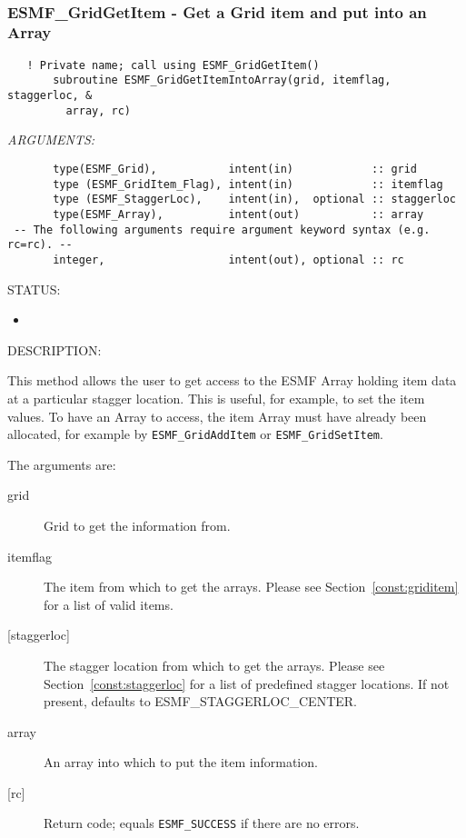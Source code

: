  
\mbox{}\hrulefill\ 
 

  \label{API:GridGetItemIntoArray}\subsubsection [ESMF\_GridGetItem] {ESMF\_GridGetItem - Get a Grid item and put into an Array}


 
\begin{verbatim}   ! Private name; call using ESMF_GridGetItem()
       subroutine ESMF_GridGetItemIntoArray(grid, itemflag,  staggerloc, &
         array, rc)\end{verbatim}{\em ARGUMENTS:}
\begin{verbatim}       type(ESMF_Grid),           intent(in)            :: grid
       type (ESMF_GridItem_Flag), intent(in)            :: itemflag
       type (ESMF_StaggerLoc),    intent(in),  optional :: staggerloc
       type(ESMF_Array),          intent(out)           :: array
 -- The following arguments require argument keyword syntax (e.g. rc=rc). --
       integer,                   intent(out), optional :: rc\end{verbatim}
{\sf STATUS:}
   \begin{itemize}
   \item{}
   \end{itemize}
  
{\sf DESCRIPTION:\\ }


      This method allows the user to get access to the ESMF Array holding
      item data at a particular stagger location. This is useful, for example,
      to set the item values. To have an Array to access, the item Array
      must have already been allocated, for example by {\tt ESMF\_GridAddItem} or
      {\tt ESMF\_GridSetItem}.
  
       The arguments are:
       \begin{description}
       \item[grid]
            Grid to get the information from.
       \item[itemflag]
            The item from which to get the arrays. Please see Section~\ref{const:griditem} for a
            list of valid items.
       \item[{[staggerloc]}]
            The stagger location from which to get the arrays.
            Please see Section~\ref{const:staggerloc} for a list
            of predefined stagger locations. If not present, defaults to ESMF\_STAGGERLOC\_CENTER.
       \item[array]
            An array into which to put the item information.
       \item[{[rc]}]
            Return code; equals {\tt ESMF\_SUCCESS} if there are no errors.
     \end{description}
   
